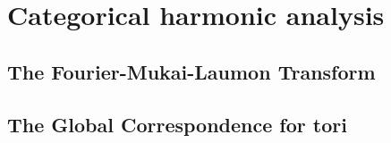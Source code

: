 \chapter{Categorical harmonic analysis}
    \begin{abstract}
        
    \end{abstract}
    
    \section{The Fourier-Mukai-Laumon Transform}
    
    \section{The Global Correspondence for tori}